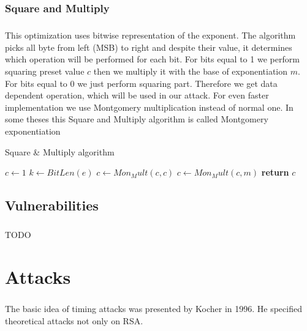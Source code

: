 \documentclass[thesis=B,english]{FITthesis}[2012/10/20]
\begin{document}
{%

\subsection{Square and Multiply}
\paragraph*{}
{This optimization uses bitwise representation of the exponent. The algorithm picks all byte from left (MSB) to right and despite their value, 
it determines which operation will be performed for each bit. For bits equal to 1 we perform squaring preset value \(c\) then we multiply it with the base of exponentiation \(m\). 
For bits equal to 0 we just perform squaring part. Therefore we get data dependent operation, which will be used in our attack. For even faster implementation we use Montgomery
multiplication instead of normal one. In some theses this Square and Multiply algorithm is called Montgomery exponentiation}



\begin{algorithm}[H]
\caption{Square \& Multiply algorithm}
\begin{algorithmic}[1]
 \State $c\gets 1$
 \State $k\gets BitLen(e)$
  \State $c \gets Mon_Mult(c,c)$
   \State $c \gets Mon_Mult(c,m)$
  \EndIf
 \EndFor
\State \textbf{return} $c$
\EndFunction
 
\end{algorithmic}
\end{algorithm}

\section{Vulnerabilities}
\paragraph*{}
{TODO}


\chapter{Attacks}
\paragraph*{}{
The basic idea of timing attacks was presented by Kocher in 1996. He specified theoretical attacks not only on RSA.
}

}
\end{document}
